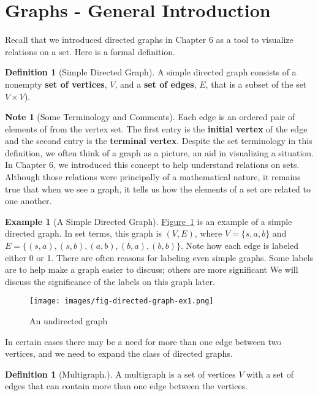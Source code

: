 \documentclass[10pt,]{book}
\newcommand{\terminology}[1]{\textbf{#1}}
\theoremstyle{plain}
\theoremstyle{definition}
\newtheorem{definition}[theorem]{Definition}
\theoremstyle{definition}
\newtheorem{note}[theorem]{Note}
\theoremstyle{definition}
\newtheorem{example}[theorem]{Example}
\theoremstyle{definition}
\theoremstyle{definition}
\numberwithin{equation}{section}
\begin{document}
\section[Graphs - General Introduction]{Graphs - General Introduction}\label{s-graphs-introduction}
Recall that we introduced directed graphs in Chapter 6 as a tool to visualize relations on a set.  Here is a formal definition.%
\begin{definition}[Simple Directed Graph]\label{def-simple-directed-graph}
 A simple directed graph consists of a nonempty \terminology{set of vertices}, \(V\), and a \terminology{set of edges}, \(E\), that is a subset of the set \(V \times V\)).  %
\end{definition}
\begin{note}[Some Terminology and Comments]\label{note-1}
Each edge is an ordered pair of elements of from the vertex set.  
The first entry is the \terminology{initial vertex} of the edge and the second entry is the \terminology{terminal vertex}. Despite the set terminology in this definition, we often think of a graph as a picture, an aid in visualizing a situation. In Chapter 6, we introduced
this concept to help understand relations on sets. Although those relations were principally of a mathematical nature, it remains true that when
we see a graph, it tells us how the elements of a set are related to one another.%
\end{note}
\begin{example}[A Simple Directed Graph]\label{ex-9-1}
\hyperref[fig-directed-graph-ex1]{Figure~\ref{fig-directed-graph-ex1}} is an example of a simple directed graph. In set terms, this graph is \((V, E)\), where \(V = \{s, a, b\}\) and \(E = \{(s, a), (s, b), (a, b), (b, a), (b,b)\}\). Note how each edge is labeled either 0 or 1. There are often reasons for labeling even simple graphs. Some labels are to help make a graph easier to discuss; others are more significant We will discuss the significance of the
labels on this graph later.%
\leavevmode%
\begin{figure}
\centering
\texttt{[image: images/fig-directed-graph-ex1.png]}
\caption{An undirected graph\label{fig-directed-graph-ex1}}
\end{figure}
\end{example}
\par
In certain cases there may be a need for more than one edge between two vertices, and we need to expand the class of directed graphs.%
\begin{definition}[Multigraph.]\label{def-multigraph}
 A multigraph is a set of vertices \(V\) with a set of edges that can contain more than one edge between the vertices.%
\end{definition}
\end{document}
